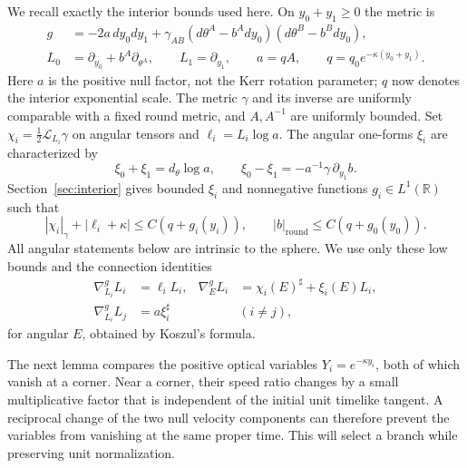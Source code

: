 We recall exactly the interior bounds used here. On
$y_0+y_1\geq0$ the metric is
\begin{equation}\label{cmp:wedge-metric}
 \begin{aligned}
 g&=-2a\,dy_0dy_1+
    \gamma_{AB}(d\theta^A-b^A dy_0)(d\theta^B-b^B dy_0),\\
 L_0&=\partial_{y_0}+b^A\partial_{\theta^A},\qquad
 L_1=\partial_{y_1},\qquad
 a=qA,\qquad q=q_0e^{-\kappa(y_0+y_1)}.
 \end{aligned}
\end{equation}
Here $a$ is the positive null factor, not the Kerr rotation parameter;
$q$ now denotes the interior exponential scale. The metric
$\gamma$ and its inverse are uniformly comparable with a fixed round
metric, and $A,A^{-1}$ are uniformly bounded. Set
$\chi_i=\tfrac12\mathcal L_{L_i}\gamma$ on angular tensors and
$\ell_i=L_i\log a$. The angular one-forms $\xi_i$ are characterized by
\[
 \xi_0+\xi_1=d_\theta\log a,
 \qquad \xi_0-\xi_1=-a^{-1}\gamma\,\partial_{y_1}b.
\]
Section~\ref{sec:interior} gives bounded $\xi_i$ and nonnegative
functions $g_i\in L^1(\mathbb R)$ such that
\begin{equation}\label{cmp:corner-low-input}
 |\chi_i|_\gamma+|\ell_i+\kappa|
       \leq C(q+g_i(y_i)),\qquad
 |b|_{\mathrm{round}}\leq C(q+g_0(y_0)).
\end{equation}
All angular statements below are intrinsic to the sphere. We use only
these low bounds and the connection identities
\begin{equation}\label{cmp:null-connections}
 \begin{aligned}
 \nabla^g_{L_i}L_i&=\ell_iL_i,&
 \nabla^g_E L_i&=\chi_i(E)^\sharp+\xi_i(E)L_i,\\
 \nabla^g_{L_i}L_j&=a\xi_i^\sharp
       &&(i\ne j),
 \end{aligned}
\end{equation}
for angular $E$, obtained by Koszul's formula.

The next lemma compares the positive optical variables
$Y_i=e^{-\kappa y_i}$, both of which vanish at a corner.
Near a corner, their speed ratio changes
by a small multiplicative factor that is independent of the initial
unit timelike tangent. A reciprocal change of the two null velocity
components can therefore prevent the variables from vanishing at
the same proper time. This will select a branch while preserving
unit normalization.

